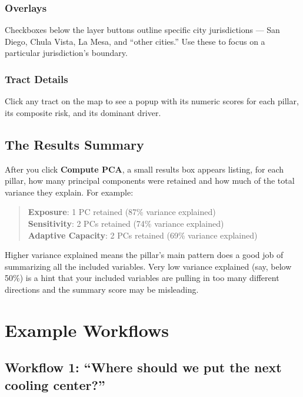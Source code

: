 \documentclass[11pt]{article}
\begin{document}
\subsubsection*{Overlays}
Checkboxes below the layer buttons outline specific city jurisdictions ---
San Diego, Chula Vista, La Mesa, and ``other cities.'' Use these to focus
on a particular jurisdiction's boundary.

\subsubsection*{Tract Details}
Click any tract on the map to see a popup with its numeric scores for
each pillar, its composite risk, and its dominant driver.

\subsection{The Results Summary}

After you click \textbf{Compute PCA}, a small results box appears
listing, for each pillar, how many principal components were retained
and how much of the total variance they explain. For example:
\begin{quote}
\textbf{Exposure}: 1 PC retained (87\% variance explained)\\
\textbf{Sensitivity}: 2 PCs retained (74\% variance explained)\\
\textbf{Adaptive Capacity}: 2 PCs retained (69\% variance explained)
\end{quote}
Higher variance explained means the pillar's main pattern does a good job
of summarizing all the included variables. Very low variance explained
(say, below 50\%) is a hint that your included variables are pulling in
too many different directions and the summary score may be misleading.

\section{Example Workflows}

\subsection{Workflow 1: ``Where should we put the next cooling center?''}
\end{document}
